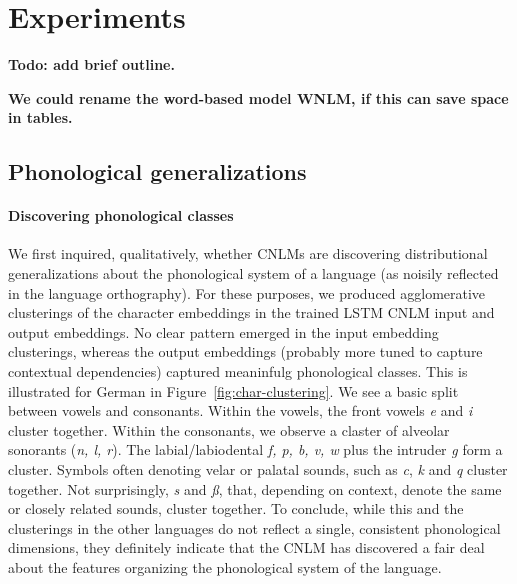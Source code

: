 \section{Experiments}
\label{sec:experiments}

\textbf{Todo: add brief outline.}

\textbf{We could rename the word-based model WNLM, if this can save space in tables.}

\subsection{Phonological generalizations}

\paragraph{Discovering phonological classes} We first inquired,
qualitatively, whether CNLMs are discovering distributional
generalizations about the phonological system of a language (as
noisily reflected in the language orthography). For these purposes, we
produced agglomerative clusterings of the character embeddings in the
trained LSTM CNLM input and output embeddings. No clear pattern
emerged in the input embedding clusterings, whereas the output
embeddings (probably more tuned to capture contextual dependencies)
captured meaninfulg phonological classes. This is illustrated for
German in Figure~\ref{fig:char-clustering}. We see a basic split
between vowels and consonants. Within the vowels, the front vowels
\emph{e} and \emph{i} cluster together. Within the consonants, we
observe a claster of alveolar sonorants (\emph{n, l, r}). The
labial/labiodental \emph{f, p, b, v, w} plus the intruder \emph{g}
form a cluster. Symbols often denoting velar or palatal sounds, such
as \emph{c}, \emph{k} and \emph{q} cluster together. Not surprisingly,
\emph{s} and \emph{{\ss}}, that, depending on context, denote the same
or closely related sounds, cluster together. To conclude, while this
and the clusterings in the other languages do not reflect a single,
consistent phonological dimensions, they definitely indicate that the
CNLM has discovered a fair deal about the features organizing the
phonological system of the language.


